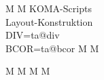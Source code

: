 \documentclass[paper=a4,pagesize,twoside,DIV=10,BCOR=1cm]{scrartcl}
\begin{document}
 \Huge\bfseries\sffamily\centering

M \hfill M
\vfill
KOMA-Scripts \\ Layout-Konstruktion \\[2ex]
DIV=\expandafter\the\csname ta@div\endcsname \\
BCOR=\expandafter\the\csname ta@bcor\endcsname
\vfill
M \hfill M

\newpage

M \hfill M
\vfill
M \hfill M
\end{document}
